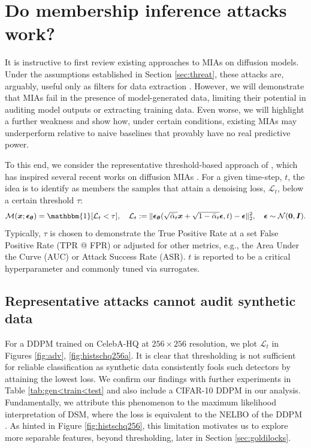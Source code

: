 \documentclass{article}
\theoremstyle{remark}
\begin{document}
\section{Do membership inference attacks work?}
\label{sec:miadoesntwork}

It is instructive to first review existing approaches to MIAs on diffusion models. Under the assumptions established in Section \ref{sec:threat}, these attacks are, arguably, useful only as filters for data extraction \citep{cannotmembership}. However, we will demonstrate that MIAs fail in the presence of model-generated data, limiting their potential in auditing model outputs or extracting training data. Even worse, we will highlight a further weakness and show how, under certain conditions, existing MIAs may underperform relative to naive baselines that provably have no real predictive power.

To this end, we consider the representative threshold-based approach of \citet{8429311}, which has inspired several recent works on diffusion MIAs \citep{10.5555/3620237.3620531, 10.5555/3618408.3618757, 10188618, kong2024an, tang2024membership, zhai2024membership}. For a given time-step, $t$, the idea is to identify as members the samples that attain a denoising loss, $\mathcal{L}_t$, below a certain threshold $\tau$:
\begin{equation}
    \label{eq:mastumoto}
    \mathcal{M}(\boldsymbol{x};\boldsymbol{\epsilon}_{\boldsymbol{\theta}})=\mathbbm{1}[\mathcal{L}_t<\tau], \quad \mathcal{L}_t:=\|\boldsymbol{\epsilon}_{\boldsymbol{\theta}}(\sqrt{\bar\alpha_t}\boldsymbol{x}+\sqrt{1-\bar\alpha_t}\boldsymbol{\epsilon},t)-\boldsymbol{\epsilon}\|^2_2, \quad \boldsymbol{\epsilon}\sim\mathcal{N}(\boldsymbol{0},\boldsymbol{I}).
\end{equation}
Typically, $\tau$ is chosen to demonstrate the True Positive Rate at a set False Positive Rate (TPR @ FPR) or adjusted for other metrics, e.g., the Area Under the Curve (AUC) or Attack Success Rate (ASR). $t$ is reported to be a critical hyperparameter \citep{10.5555/3620237.3620531} and commonly tuned via surrogates.
\subsection{Representative attacks cannot audit synthetic data}
\label{subsec:genrobust}

For a DDPM trained on CelebA-HQ \citep{karras2018progressive} at $256\times256$ resolution, we plot $\mathcal{L}_t$ in Figures \ref{fig:adv}, \ref{fig:histschq256a}.  It is clear that thresholding is not sufficient for reliable classification as synthetic data consistently fools such detectors by attaining the lowest loss. We confirm our findings with further experiments in Table \ref{tab:gen<train<test} and also include a CIFAR-10 \citep{Krizhevsky2009LearningML} DDPM in our analysis. Fundamentally, we attribute this phenomenon to the maximum likelihood interpretation of DSM, where the loss is equivalent to the NELBO of the DDPM \citep{NEURIPS2020_4c5bcfec}. As hinted in Figure \ref{fig:histschq256}, this limitation motivates us to explore more separable features, beyond thresholding, later in Section \ref{sec:goldilocks}.
\end{document}
